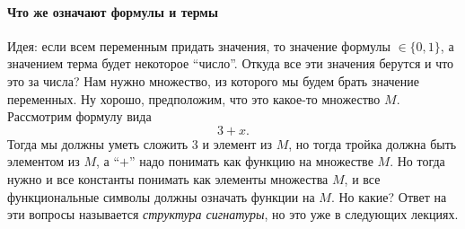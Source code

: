 \paragraph{Что же означают формулы и термы}
Идея: если всем переменным придать значения, то значение формулы $\in \{0, 1\}$, а значением терма будет некоторое \enquote{число}.
Откуда все эти значения берутся и что это за числа?
Нам нужно множество, из которого мы будем брать значение переменных.
Ну хорошо, предположим, что это какое-то множество $M$.
Рассмотрим формулу вида
$$
    3 + x.
$$
Тогда мы должны уметь сложить 3 и элемент из $M$, но тогда тройка должна быть элементом из $M$, а \enquote{$+$} надо понимать как функцию на множестве $M$.
Но тогда нужно и все константы понимать как элементы множества $M$, и все функциональные символы должны означать функции на $M$.
Но какие?
Ответ на эти вопросы называется {\it структура сигнатуры}, но это уже в следующих лекциях.